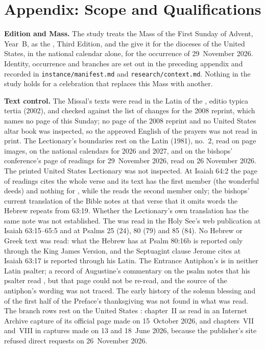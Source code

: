 \section{Appendix: Scope and Qualifications}
\label{sec:scope}

{\small
\textbf{Edition and Mass.} The study treats the Mass of the First Sunday of
Advent, Year~B, as the , Third Edition, and the
 give it for the dioceses of the United States, in
the national calendar alone, for the occurrence of 29~November 2026. Identity,
occurrence and branches are set out in the preceding appendix and recorded in
\texttt{instance/manifest.md} and \texttt{research/context.md}. Nothing in the
study holds for a celebration that replaces this Mass with another.

\textbf{Text control.} The Missal's texts were read in the Latin of the
, editio typica tertia (2002), and checked against the
list of changes for the 2008 reprint, which names no page of this Sunday; no
page of the 2008 reprint and no United States altar book was inspected, so the
approved English of the prayers was not read in print. The Lectionary's
boundaries rest on the Latin  (1981), no.~2, read
on page images, on the national calendars for 2026 and 2027, and on the
bishops' conference's page of readings for 29~November 2026, read on 26
November 2026. The printed United States Lectionary was not inspected. At
Isaiah 64:2 the page of readings cites the whole verse and its text has the
first member (the wonderful deeds) and nothing for , while
the  reads the second member only; the bishops' current
translation of the Bible notes at that verse that it omits words the Hebrew
repeats from 63:19. Whether the Lectionary's own translation has the same
note was not established. The  was read in the Holy See's
web publication at Isaiah 63:15--65:5 and at Psalms 25 (24), 80 (79) and
85 (84). No Hebrew or Greek text was read: what the Hebrew has at Psalm
80:16b is reported only through the King James Version, and the Septuagint
clause Jerome cites at Isaiah 63:17 is reported through his Latin. The
Entrance Antiphon's  is in neither Latin psalter; a
record of Augustine's commentary on the psalm notes that his psalter read
, but that page could not be re-read, and the source of the
antiphon's wording was not traced. The early history of the solemn blessing
and of the first half of the Preface's thanksgiving was not found in what was
read. The branch rows rest on the United States :
chapter~II as read in an Internet Archive capture of its official page made
on 15~October 2026, and chapters~VII and~VIII in captures made on 13 and
18~June 2026, because the publisher's site refused direct requests on
26~November 2026.

}
